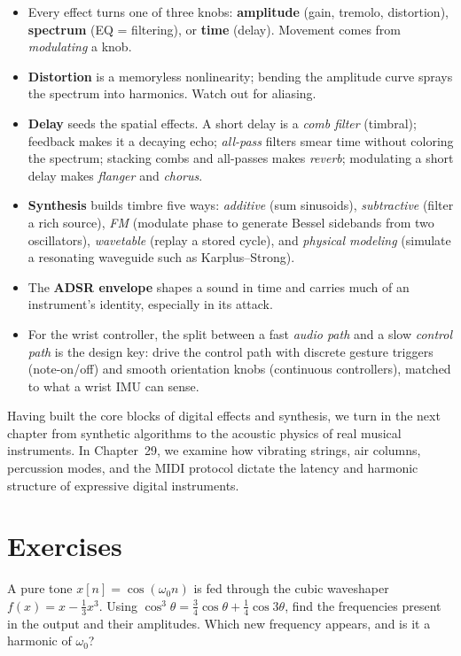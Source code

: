 \begin{itemize}
  \item Every effect turns one of three knobs: \textbf{amplitude} (gain,
        tremolo, distortion), \textbf{spectrum} (EQ = filtering), or
        \textbf{time} (delay). Movement comes from \emph{modulating} a knob.
  \item \textbf{Distortion} is a memoryless nonlinearity; bending the amplitude
        curve sprays the spectrum into harmonics. Watch out for aliasing.
  \item \textbf{Delay} seeds the spatial effects. A short delay is a \emph{comb
        filter} (timbral); feedback makes it a decaying echo; \emph{all-pass}
        filters smear time without coloring the spectrum; stacking combs and
        all-passes makes \emph{reverb}; modulating a short delay makes
        \emph{flanger} and \emph{chorus}.
  \item \textbf{Synthesis} builds timbre five ways: \emph{additive} (sum
        sinusoids), \emph{subtractive} (filter a rich source), \emph{FM} (modulate
        phase to generate Bessel sidebands from two oscillators), \emph{wavetable}
        (replay a stored cycle), and \emph{physical modeling} (simulate a resonating
        waveguide such as Karplus--Strong).
  \item The \textbf{ADSR envelope} shapes a sound in time and carries much of an
        instrument's identity, especially in its attack.
  \item For the wrist controller, the split between a fast \emph{audio path} and
        a slow \emph{control path} is the design key: drive the control path with
        discrete gesture triggers (note-on/off) and smooth orientation knobs
        (continuous controllers), matched to what a wrist IMU can sense.
\end{itemize}

Having built the core blocks of digital effects and synthesis, we turn in the next
chapter from synthetic algorithms to the acoustic physics of real musical instruments.
In Chapter~29, we examine how vibrating strings, air columns, percussion modes, and
the MIDI protocol dictate the latency and harmonic structure of expressive digital instruments.

\section{Exercises}
\label{ch28:exercises}

\begin{exercise}
A pure tone $x[n]=\cos(\omega_0 n)$ is fed through the cubic waveshaper
$f(x)=x-\tfrac13 x^3$. Using $\cos^3\theta=\tfrac34\cos\theta+\tfrac14\cos3\theta$,
find the frequencies present in the output and their amplitudes. Which new
frequency appears, and is it a harmonic of $\omega_0$?
\end{exercise}

